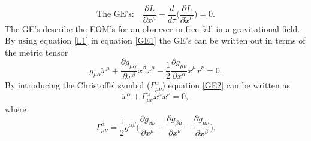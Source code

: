 \begin{equation}
	\text{The GE's:}\quad \frac{\partial L}{\partial x^\mu}-\frac{d}{d\tau}\bigg(\frac{\partial L}{\partial \dot{x}^\mu}\bigg)=0.
	\label{GE1}
\end{equation} 
The GE's describe the EOM's for an observer in free fall in a gravitational field. By using equation \eqref{L1} in equation \eqref{GE1} the GE's can be written out in terms of the metric tensor
\begin{equation}
	g_{\mu\alpha}\ddot{x}^\mu+\frac{\partial g_{\mu\alpha}}{\partial x^\beta}\dot{x}^\beta \dot{x}^\mu-\frac{1}{2}\frac{\partial g_{\mu\nu}}{\partial x^\alpha}\dot{x}^\mu\dot{x}^\nu=0.
	\label{GE2}
\end{equation} 
By introducing the Christoffel symbol ($\Gamma^\alpha_{\mu\nu}$) equation \eqref{GE2} can be written as
\begin{equation}
	\ddot{x}^\alpha+\Gamma^\alpha_{\mu\nu}\dot{x}^\mu\dot{x}^\nu=0,
	\label{GE3}
\end{equation} 
where
\begin{equation}
	\Gamma^\alpha_{\mu\nu}=\frac{1}{2}g^{\alpha\beta}\bigg(\frac{\partial g_{\beta\nu}}{\partial x^\mu}+\frac{\partial g_{\beta\mu}}{\partial x^\nu}-\frac{\partial g_{\mu\nu}}{\partial x^\beta}\bigg).
	\label{christoffel}
\end{equation} 

